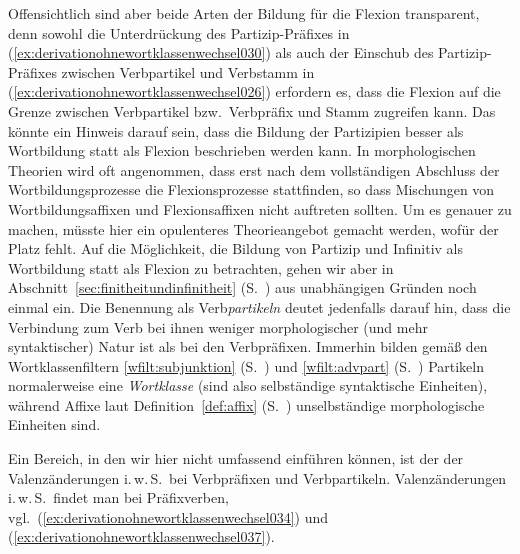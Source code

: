 \label{abs:derivationohnewortklassenwechsel033}Offensichtlich sind aber beide Arten der Bildung für die Flexion transparent, denn sowohl die Unterdrückung des Partizip-Präfixes in (\ref{ex:derivationohnewortklassenwechsel030}) als auch der Einschub des Partizip-Präfixes zwischen Verbpartikel und Verbstamm in (\ref{ex:derivationohnewortklassenwechsel026}) erfordern es, dass die Flexion auf die Grenze zwischen Verbpartikel bzw.\ Verbpräfix und Stamm zugreifen kann.
Das könnte ein Hinweis darauf sein, dass die Bildung der Partizipien besser als Wortbildung statt als Flexion beschrieben werden kann.
In morphologischen Theorien wird oft angenommen, dass erst nach dem vollständigen Abschluss der Wortbildungsprozesse die Flexionsprozesse stattfinden, so dass Mischungen von Wortbildungsaffixen und Flexionsaffixen nicht auftreten sollten.
Um es genauer zu machen, müsste hier ein opulenteres Theorieangebot gemacht werden, wofür der Platz fehlt.
Auf die Möglichkeit, die Bildung von Partizip und Infinitiv als Wortbildung statt als Flexion zu betrachten, gehen wir aber in Abschnitt~\ref{sec:finitheitundinfinitheit} (S.~\pageref{abs:finitheitundinfinitheit063}) aus unabhängigen Gründen noch einmal ein.
Die Benennung als Verb\textit{partikeln} deutet jedenfalls darauf hin, dass die Verbindung zum Verb bei ihnen weniger morphologischer (und mehr syntaktischer) Natur ist als bei den Verbpräfixen.
Immerhin bilden gemäß den Wortklassenfiltern \ref{wfilt:subjunktion} (S.~\pageref{wfilt:subjunktion}) und \ref{wfilt:advpart} (S.~\pageref{wfilt:advpart}) Partikeln normalerweise eine \textit{Wortklasse} (sind also selbständige syntaktische Einheiten), während Affixe laut Definition~\ref{def:affix} (S.~\pageref{def:affix}) unselbständige morphologische Einheiten sind.

Ein Bereich, in den wir hier nicht umfassend einführen können, ist der der Valenzänderungen i.\,w.\,S.\ bei Verbpräfixen und Verbpartikeln.
Valenzänderungen i.\,w.\,S.\ findet man bei Präfixverben, vgl.\ (\ref{ex:derivationohnewortklassenwechsel034}) und (\ref{ex:derivationohnewortklassenwechsel037}).

\begin{exe}
  \ex \label{ex:derivationohnewortklassenwechsel034}
  \begin{xlist}
  \end{xlist}
  \ex \label{ex:derivationohnewortklassenwechsel037}
  \begin{xlist}
  \end{xlist}
\end{exe}

